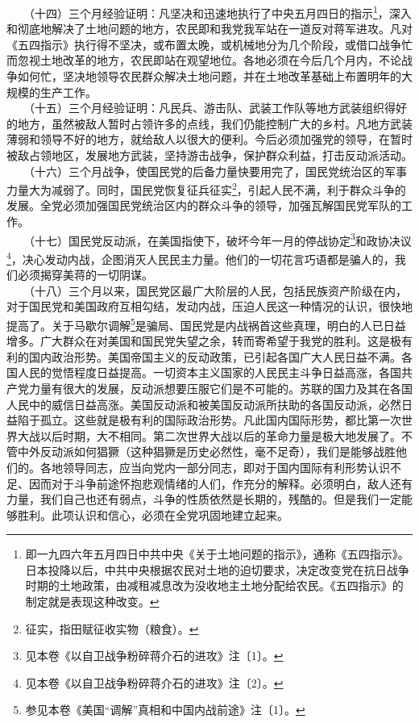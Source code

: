 \documentclass[cn,11pt,chinese]{elegantbook}
\begin{document}
　　（十四）三个月经验证明：凡坚决和迅速地执行了中央五月四日的指示\footnote[5]{ 即一九四六年五月四日中共中央《关于土地问题的指示》，通称《五四指示》。日本投降以后，中共中央根据农民对土地的迫切要求，决定改变党在抗日战争时期的土地政策，由减租减息改为没收地主土地分配给农民。《五四指示》的制定就是表现这种改变。}，深入和彻底地解决了土地问题的地方，农民即和我党我军站在一道反对蒋军进攻。凡对《五四指示》执行得不坚决，或布置太晚，或机械地分为几个阶段，或借口战争忙而忽视土地改革的地方，农民即站在观望地位。各地必须在今后几个月内，不论战争如何忙，坚决地领导农民群众解决土地问题，并在土地改革基础上布置明年的大规模的生产工作。\\
　　（十五）三个月经验证明：凡民兵、游击队、武装工作队等地方武装组织得好的地方，虽然被敌人暂时占领许多的点线，我们仍能控制广大的乡村。凡地方武装薄弱和领导不好的地方，就给敌人以很大的便利。今后必须加强党的领导，在暂时被敌占领地区，发展地方武装，坚持游击战争，保护群众利益，打击反动派活动。\\
　　（十六）三个月战争，使国民党的后备力量快要用完了，国民党统治区的军事力量大为减弱了。同时，国民党恢复征兵征实\footnote[6]{ 征实，指田赋征收实物（粮食）。}，引起人民不满，利于群众斗争的发展。全党必须加强国民党统治区内的群众斗争的领导，加强瓦解国民党军队的工作。\\
　　（十七）国民党反动派，在美国指使下，破坏今年一月的停战协定\footnote[7]{ 见本卷《以自卫战争粉碎蒋介石的进攻》注〔1〕。}和政协决议\footnote[8]{ 见本卷《以自卫战争粉碎蒋介石的进攻》注〔2〕。}，决心发动内战，企图消灭人民民主力量。他们的一切花言巧语都是骗人的，我们必须揭穿美蒋的一切阴谋。\\
　　（十八）三个月以来，国民党区最广大阶层的人民，包括民族资产阶级在内，对于国民党和美国政府互相勾结，发动内战，压迫人民这一种情况的认识，很快地提高了。关于马歇尔调解\footnote[9]{ 参见本卷《美国“调解”真相和中国内战前途》注〔1〕。}是骗局、国民党是内战祸首这些真理，明白的人已日益增多。广大群众在对美国和国民党失望之余，转而寄希望于我党的胜利。这是极有利的国内政治形势。美国帝国主义的反动政策，已引起各国广大人民日益不满。各国人民的觉悟程度日益提高。一切资本主义国家的人民民主斗争日益高涨，各国共产党力量有很大的发展，反动派想要压服它们是不可能的。苏联的国力及其在各国人民中的威信日益高涨。美国反动派和被美国反动派所扶助的各国反动派，必然日益陷于孤立。这些就是极有利的国际政治形势。凡此国内国际形势，都比第一次世界大战以后时期，大不相同。第二次世界大战以后的革命力量是极大地发展了。不管中外反动派如何猖獗（这种猖獗是历史必然性，毫不足奇），我们是能够战胜他们的。各地领导同志，应当向党内一部分同志，即对于国内国际有利形势认识不足、因而对于斗争前途怀抱悲观情绪的人们，作充分的解释。必须明白，敌人还有力量，我们自己也还有弱点，斗争的性质依然是长期的，残酷的。但是我们一定能够胜利。此项认识和信心，必须在全党巩固地建立起来。\\
\end{document}

